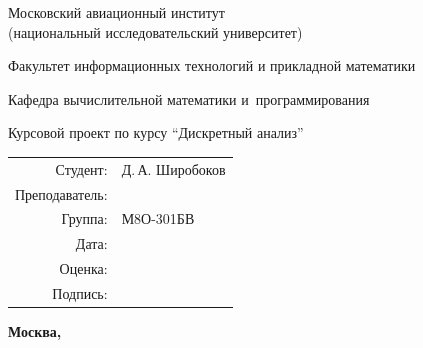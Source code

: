 \begin{titlepage}
\begin{center}
\bfseries

{\Large Московский авиационный институт\\ (национальный исследовательский университет)

}

\vspace{48pt}

{\large Факультет информационных технологий и прикладной математики
}

\vspace{36pt}

{\large Кафедра вычислительной математики и~программирования

}


\vspace{48pt}

Курсовой проект по курсу \enquote{Дискретный анализ}

\end{center}

\vspace{72pt}

\begin{flushright}
\begin{tabular}{rl}
Студент: & Д.\,А. Широбоков \\
Преподаватель: & \\
Группа: & М8О-301БВ \\
Дата: & \\
Оценка: & \\
Подпись: & \\
\end{tabular}
\end{flushright}

\vfill

\begin{center}
\bfseries
Москва, \the\year
\end{center}
\end{titlepage}

\pagebreak
